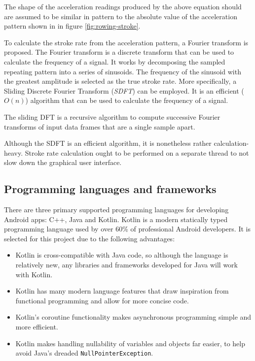 \documentclass[11pt,twoside,a4paper]{report}
\begin{document}
The shape of the acceleration readings produced by the above equation should are assumed to be similar in pattern to the absolute value of the acceleration pattern shown in in figure \ref{fig:rowing-stroke}.

To calculate the stroke rate from the acceleration pattern, a Fourier transform is proposed. The Fourier transform is a discrete transform that can be used to calculate the frequency of a signal. It works by decomposing the sampled repeating pattern into a series of sinusoids. The frequency of the sinusoid with the greatest amplitude is selected as the true stroke rate. More specifically, a Sliding Discrete Fourier Transform (\textit{SDFT}) can be employed. It is an efficient ($O(n)$) algorithm that can be used to calculate the frequency of a signal.

\begin{displayquote}
  The sliding DFT is a recursive algorithm to compute successive Fourier transforms of input data frames that are a single sample apart.\cite{sliding_smoother_than_jumping} 
\end{displayquote}

Although the SDFT is an efficient algorithm, it is nonetheless rather calculation-heavy. Stroke rate calculation ought to be performed on a separate thread to not slow down the graphical user interface.

\subsection{Programming languages and frameworks}

There are three primary supported programming languages for developing Android apps: C++, Java and Kotlin. Kotlin is a modern statically typed programming language used by over 60\% of professional Android developers. It is selected for this project due to the following advantages: 
\begin{itemize}
  \item Kotlin is cross-compatible with Java code, so although the language is relatively new, any libraries and frameworks developed for Java will work with Kotlin.
  \item Kotlin has many modern language features that draw inspiration from functional programming and allow for more concise code.
  \item Kotlin's coroutine functionality makes asynchronous programming simple and more efficient.
  \item Kotlin makes handling nullability of variables and objects far easier, to help avoid Java's dreaded \texttt{NullPointerException}. 
\end{itemize}
\end{document}
